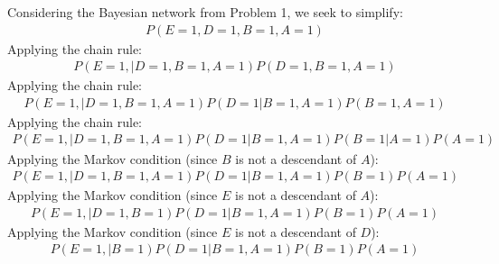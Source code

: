 \documentclass{article}
\begin{document}
\clearpage
\problem{}
Considering the Bayesian network from Problem 1, we seek to simplify:
\begin{align*}
    P(E = 1, D = 1, B = 1, A = 1)
\end{align*}
Applying the chain rule:
\begin{align*}
    P(E = 1, | D = 1, B = 1, A = 1)P(D = 1, B = 1, A = 1)
\end{align*}
Applying the chain rule:
\begin{align*}
    P(E = 1, | D = 1, B = 1, A = 1)P(D = 1 | B = 1, A = 1)P(B = 1, A = 1)
\end{align*}
Applying the chain rule:
\begin{align*}
    P(E = 1, | D = 1, B = 1, A = 1)P(D = 1 | B = 1, A = 1)P(B = 1 | A = 1)P(A = 1)
\end{align*}
Applying the Markov condition (since $B$ is not a descendant of $A$):
\begin{align*}
    P(E = 1, | D = 1, B = 1, A = 1)P(D = 1 | B = 1, A = 1)P(B = 1)P(A = 1)
\end{align*}
Applying the Markov condition (since $E$ is not a descendant of $A$):
\begin{align*}
    P(E = 1, | D = 1, B = 1)P(D = 1 | B = 1, A = 1)P(B = 1)P(A = 1)
\end{align*}
Applying the Markov condition (since $E$ is not a descendant of $D$):
\begin{align*}
    P(E = 1, | B = 1)P(D = 1 | B = 1, A = 1)P(B = 1)P(A = 1)
\end{align*}
\end{document}
